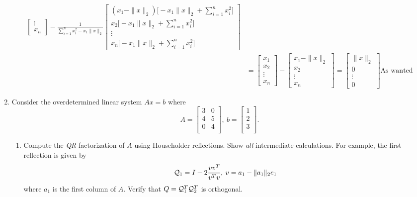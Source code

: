 \documentclass{article}
\newcommand{\twonorm}[1]{\| #1 \|_2}
\begin{document}
\begin{enumerate}
{\begin{align*}
\begin{bmatrix}
        \vdots \\
        x_n
      \end{bmatrix}
     - \frac{1}{\sum_{i=1}^{n}x_i^2 - x_1\twonorm{x}}
     \begin{bmatrix}
        (x_1 - \twonorm{x}) \Big[  - x_1\twonorm{x} + \sum_{i=1}^{n}x_i^2 \Big] \\
        x_2 \Big[ - x_1\twonorm{x} + \sum_{i=1}^{n}x_i^2 \Big]\\
        \vdots  \\
        x_n \Big[ - x_1\twonorm{x} + \sum_{i=1}^{n}x_i^2 \Big]
    \end{bmatrix} \\
    &= 
    \begin{bmatrix}
        x_1 \\
        x_2 \\
        \vdots \\
        x_n
      \end{bmatrix}
      -
     \begin{bmatrix}
        x_1 - \twonorm{x} \\
        x_2 \\
        \vdots  \\
        x_n
    \end{bmatrix} = 
     \begin{bmatrix}
        \twonorm{x} \\
        0\\
        \vdots  \\
        0
    \end{bmatrix} \text{As wanted}
  \end{align*}
  }
  \item Consider the overdetermined linear system $Ax = b$ where
  \[ A = 
  \begin{bmatrix}
    3 & 0 \\
    4 & 5 \\
    0 & 4 \\
  \end{bmatrix}
  ,\: b = 
  \begin{bmatrix}
    1 \\
    2 \\
    3 \\
  \end{bmatrix}.
  \]
  \begin{enumerate}
      \item Compute the \textit{QR}-factorization of $A$ using Householder reflections. Show \textit{all} intermediate calculations. For example, the first reflection is given by 
      \[
        \calQ_1 = I - 2 \frac{vv^T}{v^Tv} , \: v = a_1 - \twonorm{a_1}e_1
      \]
      where $a_1$ is the first column of $A$. Verify that $Q = \mathcal{Q}_1^T\mathcal{Q}_2^T$ is orthogonal.
      

\end{enumerate}
\end{enumerate}
\end{document}
